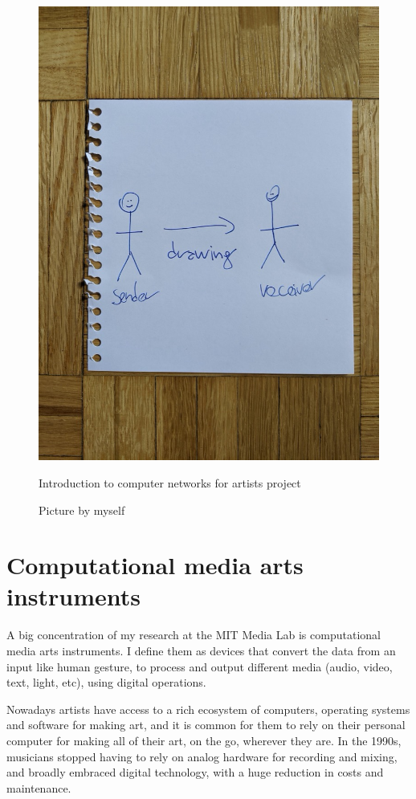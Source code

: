 \begin{figure}[ht]
  \centering
  \includegraphics[width=0.75\linewidth,height=0.35\textheight,keepaspectratio]{images/intro-to-computer-networks-for-artists.jpg}
  \caption{Introduction to computer networks for artists project}
  \caption*{Picture by myself}
  \label{fig:intro-to-computer-networks-for-artists}
\end{figure}

\section{Computational media arts instruments}

A big concentration of my research at the MIT Media Lab is computational media arts instruments. I define them as devices that convert the data from an input like human gesture, to process and output different media (audio, video, text, light, etc), using digital operations.

Nowadays artists have access to a rich ecosystem of computers, operating systems and software for making art, and it is common for them to rely on their personal computer for making all of their art, on the go, wherever they are. In the 1990s, musicians stopped having to rely on analog hardware for recording and mixing, and broadly embraced digital technology, with a huge reduction in costs and maintenance.

